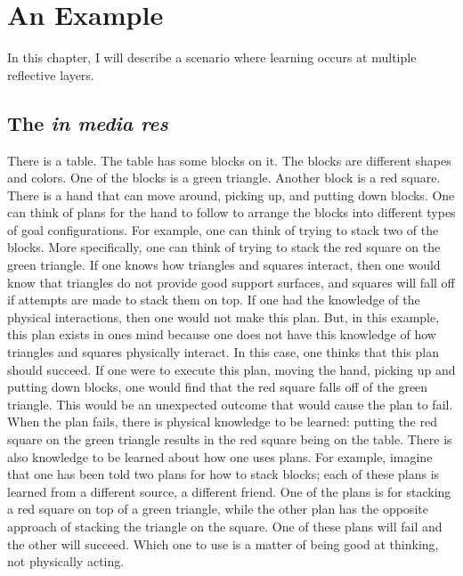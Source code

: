 \chapter{An Example}
\label{chapter:an_example}

In this chapter, I will describe a scenario where learning occurs at
multiple reflective layers.

\section{The \emph{in media res}}

There is a table.  The table has some blocks on it.  The blocks are
different shapes and colors.  One of the blocks is a green triangle.
Another block is a red square.  There is a hand that can move around,
picking up, and putting down blocks.  One can think of plans for the
hand to follow to arrange the blocks into different types of goal
configurations.  For example, one can think of trying to stack two of
the blocks.  More specifically, one can think of trying to stack the
red square on the green triangle.  If one knows how triangles and
squares interact, then one would know that triangles do not provide
good support surfaces, and squares will fall off if attempts are made
to stack them on top.  If one had the knowledge of the physical
interactions, then one would not make this plan.  But, in this
example, this plan exists in ones mind because one does not have this
knowledge of how triangles and squares physically interact.  In this
case, one thinks that this plan should succeed.  If one were to
execute this plan, moving the hand, picking up and putting down
blocks, one would find that the red square falls off of the green
triangle.  This would be an unexpected outcome that would cause the
plan to fail.  When the plan fails, there is physical knowledge to be
learned: putting the red square on the green triangle results in the
red square being on the table.  There is also knowledge to be learned
about how one uses plans.  For example, imagine that one has been told
two plans for how to stack blocks; each of these plans is learned from
a different source, a different friend.  One of the plans is for
stacking a red square on top of a green triangle, while the other plan
has the opposite approach of stacking the triangle on the square.  One
of these plans will fail and the other will succeed.  Which one to use
is a matter of being good at thinking, not physically acting.








